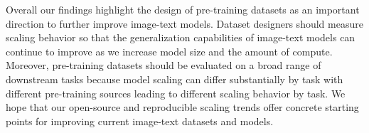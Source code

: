 \documentclass[11pt,table]{article}
\begin{document}
Overall our findings highlight the design of pre-training datasets as an important direction to further improve image-text models.
Dataset designers should measure scaling behavior so that the generalization capabilities of image-text models can continue to improve as we increase model size and the amount of compute.
Moreover, pre-training datasets should be evaluated on a broad range of downstream tasks because model scaling can differ substantially by task with different pre-training sources leading to different scaling behavior by task.
We hope that our open-source and reproducible scaling trends offer concrete starting points for improving current image-text datasets and models.












\end{document}

